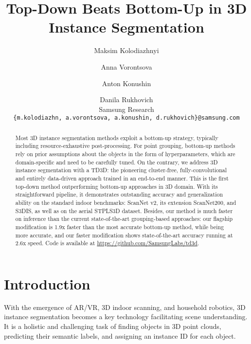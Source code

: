 \documentclass[10pt,twocolumn,letterpaper]{article}
\begin{document}
\title{Top-Down Beats Bottom-Up in 3D Instance Segmentation}

\author{Maksim Kolodiazhnyi
\and Anna Vorontsova
\and Anton Konushin
\and Danila Rukhovich\\
Samsung Research\\
{\tt\small \{m.kolodiazhn, a.vorontsova, a.konushin, d.rukhovich\}@samsung.com} \\
}

\maketitle

\begin{abstract}
   Most 3D instance segmentation methods exploit a bottom-up strategy, typically including resource-exhaustive post-processing. For point grouping, bottom-up methods rely on prior assumptions about the objects in the form of hyperparameters, which are domain-specific and need to be carefully tuned. On the contrary, we address 3D instance segmentation with a TD3D: the pioneering cluster-free, fully-convolutional and entirely data-driven approach trained in an end-to-end manner. This is the first top-down method outperforming bottom-up approaches in 3D domain. With its straightforward pipeline, it demonstrates outstanding accuracy and generalization ability on the standard indoor benchmarks: ScanNet v2, its extension ScanNet200, and S3DIS, as well as on the aerial STPLS3D dataset. Besides, our method is much faster on inference than the current state-of-the-art grouping-based approaches: our flagship modification is 1.9x faster than the most accurate bottom-up method, while being more accurate, and our faster modification shows state-of-the-art accuracy running at 2.6x speed. Code is available at \url{https://github.com/SamsungLabs/td3d}.
\end{abstract}



\section{Introduction}
\label{sec:intro}

With the emergence of AR/VR, 3D indoor scanning, and household robotics, 3D instance segmentation becomes a key technology facilitating scene understanding. It is a holistic and challenging task of finding objects in 3D point clouds, predicting their semantic labels, and assigning an instance ID for each object. 
\end{document}

